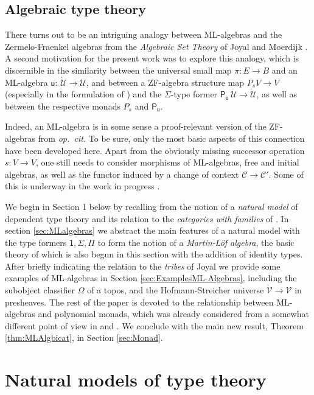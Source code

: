\documentclass[12pt,reqno]{amsart}
\newcommand{\CC}{\ensuremath{\mathcal{C}}}
\newcommand{\alg}[1]{\ensuremath{\mathsf{#1}}}
\renewcommand{\to}{\ensuremath{\rightarrow}}
\newcommand{\U}{\ensuremath{\mathcal{U}}}
\newcommand{\UU}{\ensuremath{\,\dot{\mathcal{U}}}}
\renewcommand{\u}{\ensuremath{\mathsf{u}}}
\newcommand{\V}{\ensuremath{\mathcal{V}}}
\newcommand{\VV}{\ensuremath{\dot{\mathcal{V}}}}
\theoremstyle{remark}
\theoremstyle{definition}
\begin{document}
\subsection*{Algebraic type theory} There turns out to be an intriguing analogy between ML-algebras and the Zermelo-Fraenkel algebras from the \emph{Algebraic Set Theory} of Joyal and Moerdijk \cite{JM:AST}.  A second motivation for the present work was to explore this analogy, which is discernible in the similarity between the universal small map $\pi : E \to B$ and an ML-algebra $\u : \UU \to \U$, and between a ZF-algebra structure map $P_sV \to V$ (especially in the formulation of \cite{Simpson:1999}) and the $\Sigma$-type former $\alg{P}_{\!\u}\, \U \to \U$, as well as between the respective monads $P_s$ and $\alg{P}_{\!\u}$. 

Indeed, an ML-algebra is in some sense a proof-relevant version of the ZF-algebras from \emph{op.\ cit.}  To be sure, only the most basic aspects of this connection have been developed here.   Apart from the obviously missing successor operation $s : V\to V$, one still needs to consider morphisms of ML-algebras, free and initial algebras, as well as the functor induced by a change of context $\CC \to \CC'$. Some of this is underway in the work in progress \cite{Fernando}.
\medskip

We begin in Section 1 below by recalling from \cite{awodey:NM} the notion of a \emph{natural model} of dependent type theory and its relation to the \emph{categories with families} of \cite{Dybjer:CWF}.  In section \ref{sec:MLalgebras} we abstract the main features of a natural model with the type formers $\mathsf{1}, \Sigma, \Pi$ to form the notion of a \emph{Martin-L\"of algebra}, the basic theory of which is also begun in this section with the addition of identity types.   After briefly indicating the relation to the \emph{tribes} of Joyal \cite{Joyal:CandT} we provide some examples of ML-algebras in Section \ref{sec:ExamplesML-Algebras}, including the subobject classifier $\Omega$ of a topos, and the Hofmann-Streicher universe $\VV\to\V$ in presheaves.  The rest of the paper is devoted to the relationship between ML-algebras and polynomial monads, which was already considered from a somewhat different point of view in \cite{ Newstead:thesis} and \cite{NA:2018}.  We conclude with the main new result, Theorem \ref{thm:MLAlgbicat}, in Section \ref{sec:Monad}. 

\section{Natural models of type theory}\label{sec:NaturalModels}
\end{document}
